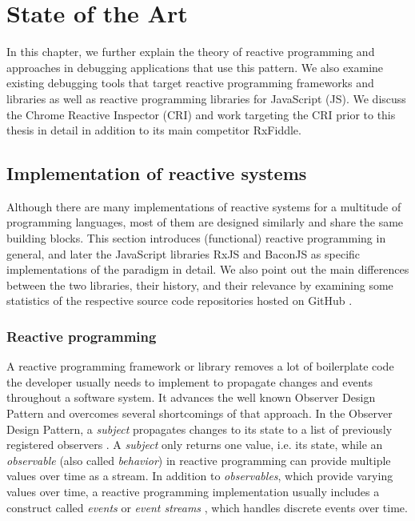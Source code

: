 \chapter{State of the Art}
\label{ch:StateOfTheArt}
In this chapter, we further explain the theory of reactive programming and approaches in debugging applications that use this pattern. We also examine existing debugging tools that target reactive programming frameworks and libraries as well as reactive programming libraries for JavaScript (JS). We discuss the Chrome Reactive Inspector (CRI) and work targeting the CRI prior to this thesis in detail in addition to its main competitor RxFiddle.

\section{Implementation of reactive systems}
Although there are many implementations of reactive systems for a multitude of programming languages, most of them are designed similarly and share the same building blocks. This section introduces (functional) reactive programming in general, and later the JavaScript libraries RxJS and BaconJS as specific implementations of the paradigm in detail. We also point out the main differences between the two libraries, their history, and their relevance by examining some statistics of the respective source code repositories hosted on GitHub \cite{RxJSRepo} \cite{BaconJSRepo}.

	\subsection{Reactive programming}
	A reactive programming framework or library removes a lot of boilerplate code the developer usually needs to implement to propagate changes and events throughout a software system. It advances the well known Observer Design Pattern and overcomes several shortcomings of that approach. In the Observer Design Pattern, a \emph{subject} propagates changes to its state to a list of previously registered observers \cite{FRP}. A \emph{subject} only returns one value, i.e. its state, while an \emph{observable} (also called \emph{behavior}) in reactive programming can provide multiple values over time as a stream.
	In addition to \emph{observables}, which provide varying values over time, a reactive programming implementation usually includes a construct called \emph{events} or \emph{event streams} \cite{BaconJS}, which handles discrete events over time.
	
